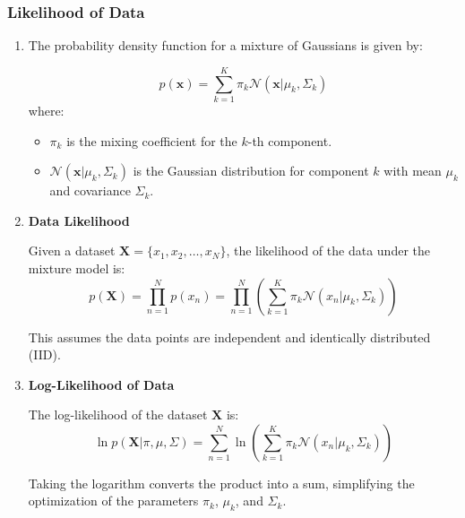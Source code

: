 \subsubsection{Likelihood of Data}
\begin{intuition}
    \begin{enumerate}
        \item The probability density function for a mixture of Gaussians is given by:

        \[
        p(\mathbf{x}) = \sum_{k=1}^{K} \pi_k \mathcal{N}(\mathbf{x} | \mu_k, \Sigma_k)
        \]
        where:
        \begin{itemize}
            \item \( \pi_k \) is the mixing coefficient for the \( k \)-th component.
            \item \( \mathcal{N}(\mathbf{x} | \mu_k, \Sigma_k) \) is the Gaussian distribution for component \( k \) with mean \( \mu_k \) and covariance \( \Sigma_k \).
        \end{itemize}
        \vspace{1em}
    
        \item \textbf{Data Likelihood}
    
        Given a dataset \( \mathbf{X} = \{x_1, x_2, \dots, x_N\} \), the likelihood of the data under the mixture model is:
        \[
        p(\mathbf{X}) = \prod_{n=1}^{N} p(x_n) = \prod_{n=1}^{N} \left( \sum_{k=1}^{K} \pi_k \mathcal{N}(x_n | \mu_k, \Sigma_k) \right)
        \]
    
        This assumes the data points are independent and identically distributed (IID).
        \vspace{1em}
    
        \item \textbf{Log-Likelihood of Data}
    
        The log-likelihood of the dataset \( \mathbf{X} \) is:
        \[
        \ln p(\mathbf{X} | \pi, \mu, \Sigma) = \sum_{n=1}^{N} \ln \left( \sum_{k=1}^{K} \pi_k \mathcal{N}(x_n | \mu_k, \Sigma_k) \right)
        \]
    
        Taking the logarithm converts the product into a sum, simplifying the optimization of the parameters \( \pi_k \), \( \mu_k \), and \( \Sigma_k \).
    \end{enumerate}
\end{intuition}


